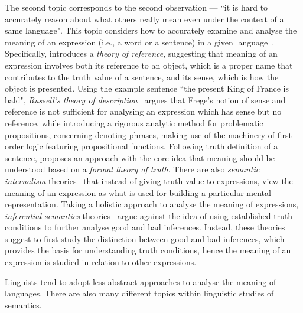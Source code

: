 The second topic corresponds to the second observation --- ``it is hard to accurately reason about what others really mean even under the context of a same language". This topic considers how to accurately examine and analyse the meaning of an expression (i.e., a word or a sentence) in a given language~\citep{lewis1970}. Specifically, \citet{frege1892} introduces a \emph{theory of reference}, suggesting that meaning of an expression involves both its reference to an object, which is a proper name that contributes to the truth value of a sentence, and its sense, which is how the object is presented. Using the example sentence ``the present King of France is bald", \emph{Russell's theory of description}~\citep{russell1904} argues that Frege's notion of sense and reference is not sufficient for analysing an expression which has sense but no reference, while introducing a rigorous analytic method for problematic propositions, concerning denoting phrases, making use of the machinery of first-order logic featuring propositional functions. Following  truth definition of a sentence, \citet{davidson1967} proposes an approach with the core idea that meaning should be understood based on a \emph{formal theory of truth}. There are also \emph{semantic internalism} theories~\citep{Mcgilvray1998, Chomsky2000, pietroski2017semantic} that instead of giving truth value to expressions, view the meaning of an expression as what is used for building a particular mental representation. Taking a holistic approach to analyse the meaning of expressions, \emph{inferential semantics} theories~\citep{Brandom2000} argue against the idea of using established truth conditions to further analyse good and bad inferences. Instead, these theories suggest to first study the distinction between good and bad inferences, which provides the basis for understanding truth conditions, hence the meaning of an expression is studied in relation to other expressions. 
\begin{center}
\vspace{-0.7em}
\vspace{-0.3em}
\end{center}

Linguists tend to adopt less abstract approaches to analyse the meaning of languages. There are also many different topics within linguistic studies of semantics.

